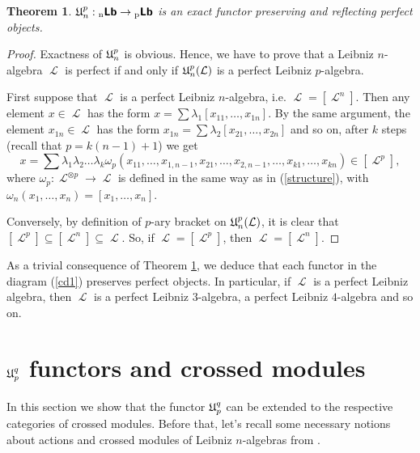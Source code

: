 \documentclass[12pt, reqno]{amsart}
\newtheorem{theorem}[definition]{Theorem}
\def\nLb{\operatorname{{}_{n}\textbf{\textsf{Lb}}}}
\def\pLb{\operatorname{{}_{p}\textbf{\textsf{Lb}}}}
\def\U{\operatorname{\frak{U}}}
\def\ele{\operatorname{\mathcal{L}}}
\begin{document}
\begin{theorem} \label{Theorem perfect}
$\U_n^p:\nLb\to \pLb$ is an exact functor preserving and reflecting perfect objects.
\end{theorem}
\begin{proof}
Exactness of $\U_n^p$ is obvious. Hence, we have to prove that a Leibniz $n$-algebra ${\ele}$ is perfect  if and only if $\U_n^p({\ele})$ is a perfect Leibniz $p$-algebra.

First suppose that ${\ele}$ is a perfect Leibniz $n$-algebra, i.e. ${\ele} =[{\ele}^n]$. Then any element $x\in {\ele}$ has the form $x = \sum \lambda_1 [x_{11}, \dots,x_{1n}]$. By the same argument,  the element $x_{1n}\in \ele$ has the form
 $x_{1n} = \sum \lambda_2 [x_{21}, \dots,x_{2n}]$ and so on, after $k$ steps (recall that $p=k(n-1)+1$) we get
 \[
 x= \sum \lambda_1 \lambda_2 \dots \lambda_{k} \omega_p (x_{11}, \dots, x_{1,n-1}, x_{21}, \dots , x_{2,n-1}, \dots, x_{k1},\dots, x_{kn}  )\in [{\ele}^p],
 \]
  where $\omega_p:{\ele}^{\otimes p}\to {\ele}$ is defined in the same way as in (\ref{structure}), with $\omega_n(x_1, \dots,x_n) = [x_1, \dots, x_n]$.

Conversely, by definition of $p$-ary bracket on  $\U_n^p({\ele})$, it is clear that $[{\ele}^p]\subseteq [{\ele}^n] \subseteq \ele$. So, if
$\ele = [ {\ele}^p ]$, then $\ele=[ {\ele}^n ]$.
\end{proof}

As a trivial consequence of Theorem \ref{Theorem perfect}, we deduce that each functor in the diagram  (\ref{cd1}) preserves perfect objects. In particular, if  ${\ele}$ is a perfect Leibniz algebra, then ${\ele}$ is a perfect Leibniz $3$-algebra, a perfect Leibniz $4$-algebra and so on.


\section{ $\U_p^q$ functors and crossed modules}

In this section we show that the functor $\U_p^q$ can be extended to the respective categories of crossed modules. Before that, let's recall some necessary notions about actions and crossed modules of Leibniz $n$-algebras from \cite{CKL1}.
\end{document}
